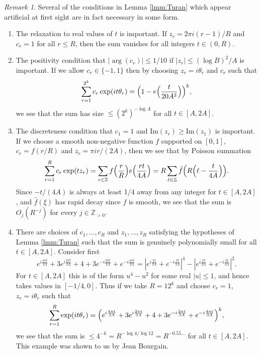 \documentclass[12pt]{amsart}
\theoremstyle{plain}
\theoremstyle{definition}
\theoremstyle{remark}
\newtheorem{remark}[theorem]{Remark}
\begin{document}
%
%
%
%
\begin{remark}\label{rmk:Turan}
Several of the conditions in Lemma \ref{lmm:Turan} which appear artificial at first sight are in fact necessary in some form.
\begin{enumerate}
\item The relaxation to real values of $t$ is important. If $z_r=2\pi i(r-1)/R$ and $c_r=1$ for all $r\le R$, then the sum vanishes for all integers $t\in(0,R)$.  
\item The positivity condition that $|\arg(c_r)|\le 1/10$ if $|z_r|\le (\log{B})^2/A$ is important. If we allow $c_r\in\{-1,1\}$ then by choosing $z_r=i\theta_r$ and $c_r$ such that 
\[
\sum_{r=1}^{2^k}c_r \exp(it\theta_r)=\Bigl(1-e\Bigl(\frac{t}{20A^2}\Bigr)\Bigr)^k,
\]
 we see that the sum has size $\leq (2^k)^{-\log A}$ for all $t\in [A,2A]$.
\item The discreteness condition that $c_1=1$ and $\text{Im}(z_r)\ge \text{Im}(z_1)$ is important. If we choose a smooth non-negative function $f$ supported on $[0,1]$, $c_r=f(r/R)$ and $z_r=\pi i r/(2A)$, then we see that by Poisson summation
\[
\sum_{r=1}^R c_r \exp(t z_r)=\sum_{r\in\mathbb{Z}}f\Bigl(\frac{r}{R}\Bigr)e\Bigl(\frac{rt}{4A}\Bigr)=R\sum_{\ell\in\mathbb{Z}}\hat{f}\Bigl(R\Bigl(\ell-\frac{t}{4A}\Bigr)\Bigr).
\]
Since $-t/(4A)$ is always at least 1/4 away from any integer for $t\in [A,2A]$, and $\hat{f}(\xi)$ has rapid decay since $f$ is smooth, we see that the sum is $O_j(R^{-j})$ for every $j\in \mathbb{Z}_{>0}$.
\item There are choices of $c_1,\ldots,c_R$ and $z_1,\dots,z_R$ satisfying the hypotheses of Lemma \ref{lmm:Turan} such that the sum is genuinely polynomially small for all $t\in[A,2A]$. Consider first
\[
e^{i\frac{4\pi t}{3A}}+3e^{i\frac{2\pi t}{3A}}+4+3e^{-i\frac{2\pi t}{3A}}+e^{-i\frac{4\pi t}{3A}}=|e^{i\frac{\pi t}{3A}}+e^{-i\frac{\pi t}{3A}}|^4-|e^{i\frac{\pi t}{3A}}+e^{-i\frac{\pi t}{3A}}|^2.
\]
For $t\in [A,2A]$ this is of the form $u^4-u^2$ for some real $|u|\le 1$, and hence takes values in $[-1/4,0]$. Thus if we take $R=12^{k}$ and choose $c_r=1$, $z_r=i\theta_r$ such that
\[
\sum_{r=1}^R \exp(i t\theta_r)=\Bigl(e^{i\frac{4\pi t}{3A}}+3e^{i\frac{2\pi t}{3A}}+4+3e^{-i\frac{2\pi t}{3A}}+e^{-i\frac{4\pi t}{3A}}\Bigr)^k,
\]
we see that the sum is $\leq 4^{-k}=R^{-\log{4}/\log{12}}=R^{-0.55\dots}$ for all $t\in [A,2A]$. This example was shown to us by Jean Bourgain.
\end{enumerate}
\end{remark}
\end{document}
